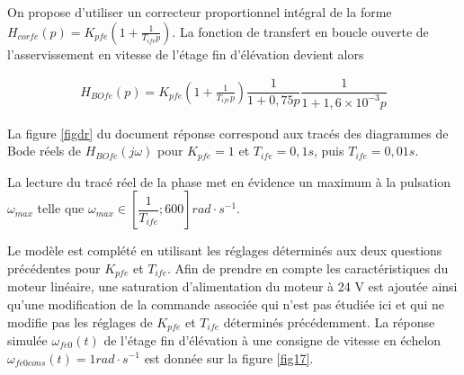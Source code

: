On propose d'utiliser un correcteur proportionnel intégral de la forme $H_{corfe}(p) = K_{pfe}\left(1+\frac{1}{T_{ife}p}\right)$. La
fonction de transfert en boucle ouverte de l'asservissement en vitesse de l'étage fin d'élévation devient alors

\begin{align*}
H_{BOfe}(p)=K_{pfe}\left(1+\frac{1}{T_{ife}p}\right)\dfrac{1}{1+0,75p}\dfrac{1}{1+1,6\times 10^{-3}p}
\end{align*}

La figure \ref{figdr} du document réponse correspond aux tracés des diagrammes de Bode réels de $H_{BOfe}(j\omega)$ pour
$K_{pfe}=1$ et $T_{ife}= 0,1 s$, puis $T_{ife} = 0,01 s$.




La lecture du tracé réel de la phase met en évidence un maximum à la pulsation $\omega_{max}$ telle que $\omega_{max}\in
\left[\dfrac{1}{T_{ife}}; 600\right] rad\cdot s^{-1}$.




Le modèle est complété en utilisant les réglages déterminés aux deux questions précédentes pour $K_{pfe}$ et $T_{ife}$. Afin de prendre en compte les caractéristiques du moteur linéaire, une saturation d'alimentation du moteur à 24 V est
ajoutée ainsi qu'une modification de la commande associée qui n'est pas étudiée ici et qui ne modifie pas les
réglages de $K_{pfe}$ et $T_{ife}$ déterminés précédemment. La réponse simulée $\omega_{fe0}(t)$ de l'étage fin d'élévation à une consigne de vitesse en échelon $\omega_{fe0cons}(t) = 1 rad\cdot s^{-1}$ est donnée sur la figure \ref{fig17}.

